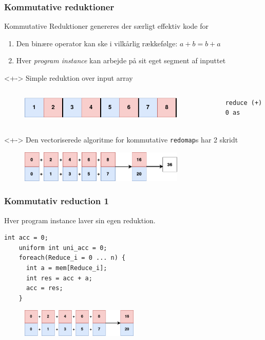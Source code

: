 \documentclass[t]{beamer}
\begin{document}
\begin{frame}[fragile]
  \frametitle{Kommutative reduktioner}
  \begin{block}{Kommutative Reduktioner genereres der særligt effektiv kode for}
  \begin{enumerate}
    \item Den binære operator kan ske i vilkårlig rækkefølge: $a + b = b + a$
    \item Hver \textit{program instance} kan arbejde på sit eget segment af inputtet
  \end{enumerate}
\end{block}
\begin{onlyenv}<+->
  Simple reduktion over input array
  \begin{columns}
  \begin{figure}[H]
  \centering
  \includegraphics[width=0.9\textwidth]{imgs/input.png}
\end{figure}

  \begin{lstlisting}[language=futhark]
    reduce (+) 0 as
  \end{lstlisting}

\end{columns}
\end{onlyenv}
\begin{onlyenv}<+->
  Den vectoriserede algoritme for kommutative \texttt{redomap}s har 2 skridt
  \begin{figure}[h!]
    \centering
    \includegraphics[width=0.7\textwidth]{imgs/kom_reduction.png}
  \end{figure}
\end{onlyenv}
\end{frame}
\begin{frame}[fragile]
  \frametitle{Kommutativ reduction 1}
  Hver program instance laver sin egen reduktion.
\begin{lstlisting}[language=ispc]
    int acc = 0;
    uniform int uni_acc = 0;
    foreach(Reduce_i = 0 ... n) {
      int a = mem[Reduce_i];
      int res = acc + a;
      acc = res;
    }
\end{lstlisting}
  \begin{figure}[H]
    \centering
    \includegraphics[width=0.5\textwidth]{imgs/kom_reduce1.png}
  \end{figure}
  \begin{center}
  \end{center}
\end{frame}
\end{document}

